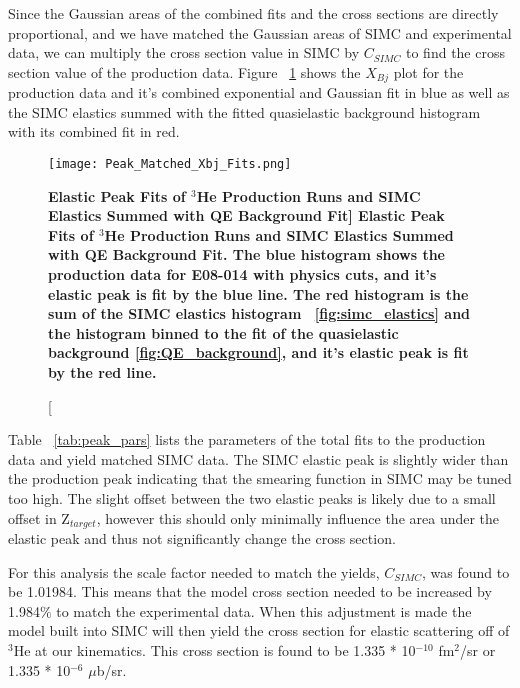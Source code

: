 Since the Gaussian areas of the combined fits and the cross sections are directly proportional, and we have matched the Gaussian areas of SIMC and experimental data, we can multiply the cross section value in SIMC by $C_{SIMC}$ to find the cross section value of the production data. Figure ~\ref{fig:final_xs} shows the $X_{Bj}$ plot for the production data and it's combined exponential and Gaussian fit in blue as well as the SIMC elastics summed with the fitted quasielastic background histogram with its combined fit in red. 

\begin{figure}[!ht]
\begin{center}
\texttt{[image: Peak\_Matched\_Xbj\_Fits.png]}
\end{center}
\caption[\bf{Elastic Peak Fits of $^{3}$He Production Runs and SIMC Elastics Summed with QE Background Fit}]{
{\bf{Elastic Peak Fits of $^{3}$He Production Runs and SIMC Elastics Summed with QE Background Fit.}} The blue histogram shows the production data for E08-014 with physics cuts, and it's elastic peak is fit by the blue line. The red histogram is the sum of the SIMC elastics histogram ~\ref{fig:simc_elastics} and the histogram binned to the fit of the quasielastic background \ref{fig:QE_background}, and it's elastic peak is fit by the red line.}
\label{fig:final_xs}
\end{figure}

Table ~\ref{tab:peak_pars} lists the parameters of the total fits to the production data and yield matched SIMC data. The SIMC elastic peak is slightly wider than the production peak indicating that the smearing function in SIMC may be tuned too high. The slight offset between the two elastic peaks is likely due to a small offset in Z$_{target}$, however this should only minimally influence the area under the elastic peak and thus not significantly change the cross section. 

For this analysis the scale factor needed to match the yields, $C_{SIMC}$, was found to be 1.01984. This means that the model cross section needed to be increased by 1.984$\%$ to match the experimental data. When this adjustment is made the model built into SIMC will then yield the cross section for elastic scattering off of $^3$He at our kinematics. This cross section is found to be 1.335 * 10$^{-10}$ fm$^2$/sr or 1.335 * 10$^{-6}$ $\mu$b/sr.

